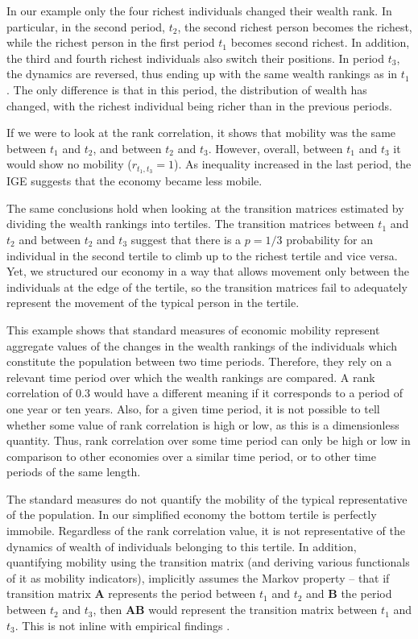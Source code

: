 \documentclass[11pt]{article}
\numberwithin{equation}{section}
\begin{document}
In our example only the four richest individuals changed their wealth rank. In particular, in the second period, $t_2$, the second richest person becomes the richest, while the richest person in the first period $t_1$ becomes second richest. In addition, the third and fourth richest individuals also switch their positions. In period $t_3$, the dynamics are reversed, thus ending up with the same wealth rankings as in $t_1$. The only difference is that in this period, the distribution of wealth has changed, with the richest individual being richer than in the previous periods.

If we were to look at the rank correlation, it shows that mobility was the same between $t_1$ and $t_2$, and between $t_2$ and $t_3$. However, overall, between $t_1$ and $t_3$ it would show no mobility ($r_{t_1,t_3} = 1$). As inequality increased in the last period, the IGE suggests that the economy became less mobile.

The same conclusions hold when looking at the transition matrices estimated by dividing the wealth rankings into tertiles. The transition matrices between $t_1$ and $t_2$ and between $t_2$ and $t_3$ suggest that there is a $p=1/3$ probability for an individual in the second tertile to climb up to the richest tertile and vice versa. Yet, we structured our economy in a way that allows movement only between the individuals at the edge of the tertile, so the transition matrices fail to adequately represent the movement of the typical person in the tertile.

This example shows that standard measures of economic mobility represent aggregate values of the changes in the wealth rankings of the individuals which constitute the population between two time periods. Therefore, they rely on a relevant time period over which the wealth rankings are compared. A rank correlation of 0.3 would have a different meaning if it corresponds to a period of one year or ten years. Also, for a given time period, it is not possible to tell whether some value of rank correlation is high or low, as this is a dimensionless quantity. Thus, rank correlation over some time period can only be high or low in comparison to other economies over a similar time period, or to other time periods of the same length.

The standard measures do not quantify the mobility of the typical representative of the population. In our simplified economy the bottom tertile is perfectly immobile. Regardless of the rank correlation value, it is not representative of the dynamics of wealth of individuals belonging to this tertile. In addition, quantifying mobility using the transition matrix (and deriving various functionals of it as mobility indicators), implicitly assumes the Markov property -- that if transition matrix $\mathbf{A}$ represents the period between $t_1$ and $t_2$ and $\mathbf{B}$ the period between $t_2$ and $t_3$, then $\mathbf{A B}$ would represent the transition matrix between $t_1$ and $t_3$. This is not inline with empirical findings \citep{Mcfarland1970,Shorrocks1978,Clark2015}.
\end{document}
